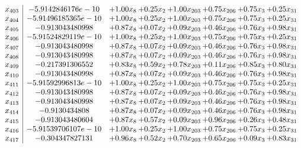 \documentclass[8pt]{article}
\begin{document}
\[\begin{array}{c| c c@{\hskip 2pt} c@{\hskip 2pt} c@{\hskip 2pt} c@{\hskip 2pt} c@{\hskip 2pt} c@{\hskip 2pt} }
 x_{403}   &  -5.9142846176e-10 & +  1.00 x_{8} & +  0.25 x_{2} & +  1.00 x_{203} & +  0.75 x_{206} & +  0.75 x_{3} & +  0.25 x_{31}\\
 x_{404}   &  -5.91496185365e-10 & +  1.00 x_{8} & +  0.25 x_{2} & +  1.00 x_{203} & +  0.75 x_{206} & +  0.75 x_{3} & +  0.25 x_{31}\\
 x_{405}   &  -0.913043480998 & +  0.87 x_{8} & +  0.07 x_{2} & +  0.09 x_{203} & +  0.46 x_{206} & +  0.76 x_{3} & +  0.98 x_{31}\\
 x_{406}   &  -5.91524829119e-10 & +  1.00 x_{8} & +  0.25 x_{2} & +  1.00 x_{203} & +  0.75 x_{206} & +  0.75 x_{3} & +  0.25 x_{31}\\
 x_{407}   &  -0.913043480998 & +  0.87 x_{8} & +  0.07 x_{2} & +  0.09 x_{203} & +  0.46 x_{206} & +  0.76 x_{3} & +  0.98 x_{31}\\
 x_{408}   &  -0.913043480998 & +  0.87 x_{8} & +  0.07 x_{2} & +  0.09 x_{203} & +  0.46 x_{206} & +  0.76 x_{3} & +  0.98 x_{31}\\
 x_{409}   &  -0.217391306552 & +  0.83 x_{8} & +  0.59 x_{2} & +  0.78 x_{203} & +  0.11 x_{206} & +  0.85 x_{3} & +  0.80 x_{31}\\
 x_{410}   &  -0.913043480998 & +  0.87 x_{8} & +  0.07 x_{2} & +  0.09 x_{203} & +  0.46 x_{206} & +  0.76 x_{3} & +  0.98 x_{31}\\
 x_{411}   &  -5.91592996813e-10 & +  1.00 x_{8} & +  0.25 x_{2} & +  1.00 x_{203} & +  0.75 x_{206} & +  0.75 x_{3} & +  0.25 x_{31}\\
 x_{412}   &  -0.913043480998 & +  0.87 x_{8} & +  0.07 x_{2} & +  0.09 x_{203} & +  0.46 x_{206} & +  0.76 x_{3} & +  0.98 x_{31}\\
 x_{413}   &  -0.913043480998 & +  0.87 x_{8} & +  0.07 x_{2} & +  0.09 x_{203} & +  0.46 x_{206} & +  0.76 x_{3} & +  0.98 x_{31}\\
 x_{414}   &  -0.9130434808 & +  0.87 x_{8} & +  0.07 x_{2} & +  0.09 x_{203} & +  0.46 x_{206} & +  0.76 x_{3} & +  0.98 x_{31}\\
 x_{415}   &  -0.913043480604 & +  0.87 x_{8} & +  0.57 x_{2} & +  0.09 x_{203} & +  0.96 x_{206} & +  0.26 x_{3} & +  0.48 x_{31}\\
 x_{416}   &  -5.91539706107e-10 & +  1.00 x_{8} & +  0.25 x_{2} & +  1.00 x_{203} & +  0.75 x_{206} & +  0.75 x_{3} & +  0.25 x_{31}\\
 x_{417}   &  -0.304347827131 & +  0.96 x_{8} & +  0.52 x_{2} & +  0.70 x_{203} & +  0.65 x_{206} & +  0.09 x_{3} & +  0.83 x_{31}\\

\end{array}\]
\end{document}
